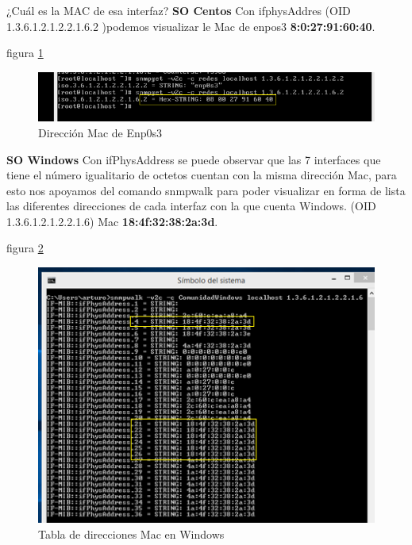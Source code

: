\item ¿Cuál es la MAC de esa interfaz?
\textbf{SO Centos}
Con ifphysAddres (OID 1.3.6.1.2.1.2.2.1.6.2 )podemos visualizar le Mac de enpos3 \textbf{8:0:27:91:60:40}.

figura  \ref{image:Pregunta6C}
 \FloatBarrier
\begin{figure}[htbp!]
		\centering
		    \includegraphics[width=.9 \textwidth]{../images/Pregunta6C.png} 
		\caption{Dirección Mac de Enp0s3}
		\label{image:Pregunta6C}
\end{figure}
\FloatBarrier

\textbf{SO Windows}
Con ifPhysAddress se puede observar que las 7 interfaces que tiene el número igualitario de octetos cuentan con la misma dirección Mac, para esto nos apoyamos del comando snmpwalk para poder visualizar en forma de lista las diferentes direcciones de cada interfaz con la que cuenta Windows. (OID 1.3.6.1.2.1.2.2.1.6)
Mac \textbf{18:4f:32:38:2a:3d}.

figura  \ref{image:Pregunta6W}
 \FloatBarrier
\begin{figure}[htbp!]
		\centering
		    \includegraphics[width=.7 \textwidth]{../images/Pregunta6W.png} 
		\caption{Tabla de direcciones Mac en Windows}
		\label{image:Pregunta6W}
\end{figure}
\FloatBarrier